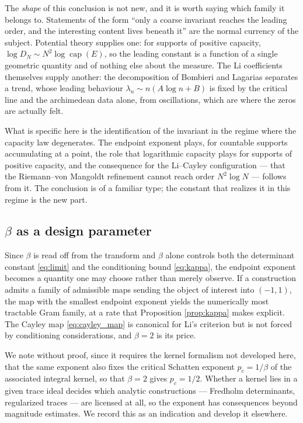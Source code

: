 \documentclass[11pt]{amsart}
\numberwithin{equation}{section}
\theoremstyle{plain}
\theoremstyle{definition}
\theoremstyle{remark}
\begin{document}
The \emph{shape} of this conclusion is not new, and it is worth saying which family it belongs to.
Statements of the form ``only a coarse invariant reaches the leading order, and the interesting
content lives beneath it'' are the normal currency of the subject. Potential theory supplies one: for
supports of positive capacity, $\log D_{N}\sim N^{2}\log\operatorname{cap}(E)$, so the leading
constant is a function of a single geometric quantity and of nothing else about the measure. The Li
coefficients themselves supply another: the decomposition of Bombieri and Lagarias
\cite{BombieriLagarias1999} separates a trend, whose leading behaviour $\lambda_{n}\sim
n(A\log n+B)$ is fixed by the critical line and the archimedean data alone, from oscillations, which
are where the zeros are actually felt.

What is specific here is the identification of the invariant in the regime where the capacity law
degenerates. The endpoint exponent plays, for countable supports accumulating at a point, the role
that logarithmic capacity plays for supports of positive capacity, and the consequence for the
Li--Cayley configuration --- that the Riemann--von Mangoldt refinement cannot reach order
$N^{2}\log N$ --- follows from it. The conclusion is of a familiar type; the constant that realizes
it in this regime is the new part.

\subsection{$\beta$ as a design parameter}

Since $\beta$ is read off from the transform and $\beta$ alone controls both the determinant
constant \eqref{eq:limit} and the conditioning bound \eqref{eq:kappa}, the endpoint exponent
becomes a quantity one may choose rather than merely observe. If a construction admits a family of
admissible maps sending the object of interest into $(-1,1)$, the map with the smallest endpoint
exponent yields the numerically most tractable Gram family, at a rate that
Proposition \ref{prop:kappa} makes explicit. The Cayley map \eqref{eq:cayley_map} is canonical for
Li's criterion but is not forced by conditioning considerations, and $\beta=2$ is its price.

We note without proof, since it requires the kernel formalism not developed here, that the same
exponent also fixes the critical Schatten exponent $p_{c}=1/\beta$ of the associated integral
kernel, so that $\beta=2$ gives $p_{c}=1/2$. Whether a kernel lies in a given trace ideal decides
which analytic constructions --- Fredholm determinants, regularized traces --- are licensed at all,
so the exponent has consequences beyond magnitude estimates. We record this as an indication and
develop it elsewhere.
\end{document}
